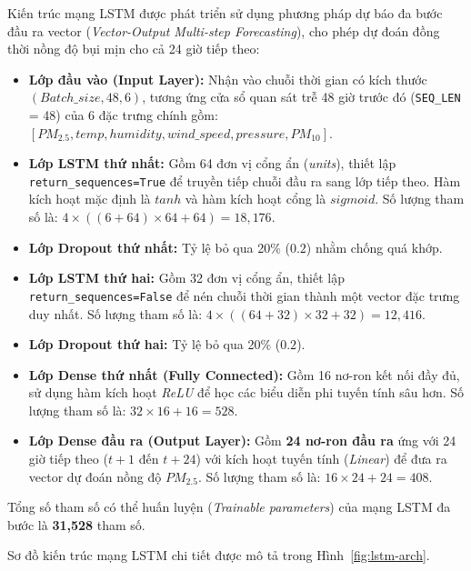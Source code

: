 \documentclass[12pt,a4paper]{article}
\begin{document}
Kiến trúc mạng LSTM được phát triển sử dụng phương pháp dự báo đa bước đầu ra vector (\textit{Vector-Output Multi-step Forecasting}), cho phép dự đoán đồng thời nồng độ bụi mịn cho cả 24 giờ tiếp theo:
\begin{itemize}
    \item \textbf{Lớp đầu vào (Input Layer):} Nhận vào chuỗi thời gian có kích thước $(Batch\_size, 48, 6)$, tương ứng cửa sổ quan sát trễ 48 giờ trước đó (\texttt{SEQ\_LEN} = 48) của 6 đặc trưng chính gồm: $[PM_{2.5}, temp, humidity, wind\_speed, pressure, PM_{10}]$.
    \item \textbf{Lớp LSTM thứ nhất:} Gồm 64 đơn vị cổng ẩn (\textit{units}), thiết lập \texttt{return\_sequences=True} để truyền tiếp chuỗi đầu ra sang lớp tiếp theo. Hàm kích hoạt mặc định là $tanh$ và hàm kích hoạt cổng là $sigmoid$. Số lượng tham số là: $4 \times ((6 + 64) \times 64 + 64) = 18,176$.
    \item \textbf{Lớp Dropout thứ nhất:} Tỷ lệ bỏ qua 20\% ($0.2$) nhằm chống quá khớp.
    \item \textbf{Lớp LSTM thứ hai:} Gồm 32 đơn vị cổng ẩn, thiết lập \texttt{return\_sequences=False} để nén chuỗi thời gian thành một vector đặc trưng duy nhất. Số lượng tham số là: $4 \times ((64 + 32) \times 32 + 32) = 12,416$.
    \item \textbf{Lớp Dropout thứ hai:} Tỷ lệ bỏ qua 20\% ($0.2$).
    \item \textbf{Lớp Dense thứ nhất (Fully Connected):} Gồm 16 nơ-ron kết nối đầy đủ, sử dụng hàm kích hoạt \textit{ReLU} để học các biểu diễn phi tuyến tính sâu hơn. Số lượng tham số là: $32 \times 16 + 16 = 528$.
    \item \textbf{Lớp Dense đầu ra (Output Layer):} Gồm \textbf{24 nơ-ron đầu ra} ứng với 24 giờ tiếp theo ($t+1$ đến $t+24$) với kích hoạt tuyến tính (\textit{Linear}) để đưa ra vector dự đoán nồng độ $PM_{2.5}$. Số lượng tham số là: $16 \times 24 + 24 = 408$.
\end{itemize}

Tổng số tham số có thể huấn luyện (\textit{Trainable parameters}) của mạng LSTM đa bước là \textbf{31,528} tham số.

Sơ đồ kiến trúc mạng LSTM chi tiết được mô tả trong Hình~\ref{fig:lstm-arch}.
\end{document}
